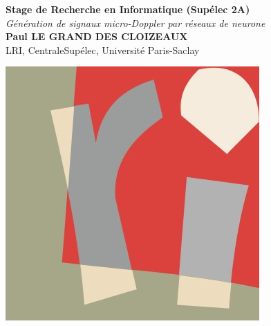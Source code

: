 \documentclass[a0,portrait]{a0poster}
\begin{document}
\large


\begin{minipage}[b]{0.75\linewidth}
\veryHuge \color{NavyBlue} \textbf{Stage de Recherche en Informatique (Sup\'e{}lec 2A)} \color{Black}\\
\Huge\textit{ Génération de signaux micro-Doppler par réseaux de neurone }\\[18mm]
\huge \textbf{Paul LE GRAND DES CLOIZEAUX}\\[0.5cm] 
\huge LRI, CentraleSupélec, Université Paris-Saclay\\[0.4cm] 
\end{minipage}
%
\begin{minipage}[b]{0.20\linewidth}
\includegraphics[width=\textwidth]{logo_lri.jpg}
\end{minipage}
\end{document}
